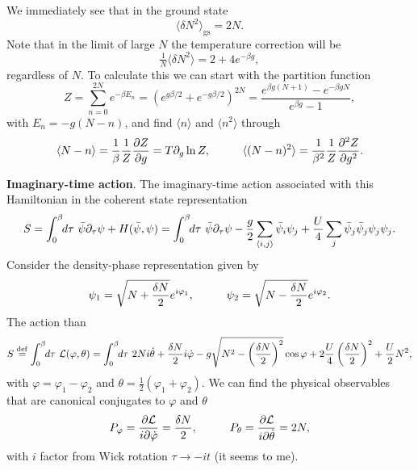 We immediately see that in the ground state 
\begin{equation}
	\langle \delta N^2\rangle_{\text{gs}} = 2N.
\end{equation}
Note that in the limit of large $N$ the temperature correction will be
\begin{equation*}
	\tfrac{1}{N} \langle \delta N^2\rangle = 2 + 4 e^{- \beta g},
\end{equation*}
regardless of $N$. To calculate this we can start with the partition function
\begin{equation*}
	Z = \sum_{n=0}^{2N} e^{-\beta E_n} = \left(e^{g \beta/2}+e^{-g \beta/2}\right)^{2N} = \frac{e^{\beta g (N+1)}-e^{- \beta g N}}{e^{\beta g}-1},
\end{equation*}
with $E_n = - g(N-n)$, and find $\langle n\rangle$ and $\langle n^2\rangle$ through
\begin{equation*}
	\langle N-n\rangle = \frac{1}{\beta} \frac{1}{Z} \frac{\partial Z}{\partial g} = T \partial_g \ln Z,
	\hspace{10 mm} 
	\langle (N-n)^2\rangle = \frac{1}{\beta^2} \frac{1}{Z} \frac{\partial^2 Z}{\partial g^2}.
\end{equation*}



\textbf{Imaginary-time action}. The imaginary-time action associated with this Hamiltonian in the coherent state representation
\begin{equation*}
	S = \int_{0}^{\beta} \hspace{-1mm} d \tau\  \bar{\psi} \partial_\tau \psi + H(\bar{\psi}, \psi)
	=  \int_{0}^{\beta} \hspace{-1mm} d \tau\  
		\bar{\psi} \partial_\tau \psi - \frac{g}{2} \sum_{\langle i,j\rangle} \bar{\psi}_i \psi_j + \frac{U}{4} \sum_j \bar{\psi}_j \bar{\psi}_j \psi_j \psi_j.
\end{equation*}
Consider the density-phase representation given by
\begin{equation*}
	\psi_1 = \sqrt{N + \frac{\delta N}{2}} e^{i \varphi_1},
	\hspace{10 mm} 
	\psi_2 = \sqrt{N - \frac{\delta N}{2}} e^{i \varphi_2}.
\end{equation*}
The action than
\begin{equation*}
	S \overset{\mathrm{def}}{=} \int_{0}^{\beta} \hspace{-1mm} d \tau\  \mathcal{L(\varphi, \theta)} = \int_{0}^{\beta} \hspace{-1mm} d \tau\  2N i \dot{\theta} + \frac{\delta N}{2} i \dot{\varphi} - g \sqrt{N^2 - \left(\frac{\delta N}{2}\right)^2} \cos \varphi + 2 \frac{U}{4} \left(\frac{\delta N}{2}\right)^2 + \frac{U}{2} N^2  ,
\end{equation*}
with $\varphi = \varphi_1 - \varphi_2$ and $\theta = \tfrac{1}{2}(\varphi_1 + \varphi_2)$. We can find the physical observables that are canonical conjugates to $\varphi$ and $\theta$
\begin{equation*}
	P_\varphi = \frac{\partial \mathcal{L}}{i \partial \dot{\varphi}} = \frac{\delta N}{2},
	\hspace{10 mm} 
	P_\theta = \frac{\partial \mathcal{L}}{i \partial \dot{\theta}} = 2 N,
\end{equation*}
with $i$ factor from Wick rotation $\tau \to - i t$ (it seems to me). 

